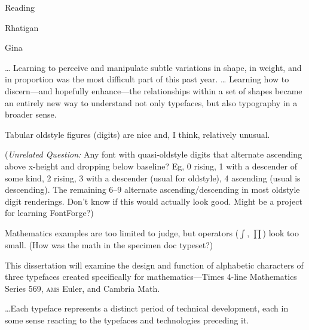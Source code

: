 \documentclass[11pt]{PalisadesLakesBook}
\begin{document}
\begin{plSection}{Reading}
\begin{plSection}{Rhatigan}
\begin{plSection}{Gina}
\begin{plSection}{}
\begin{plQuote}{}{}
{\ldots}
Learning to perceive and manipulate subtle variations in shape,
in weight, and in proportion was the most difficult part 
of this past year.
{\ldots} Learning how to discern---and hopefully enhance---the
relationships within a set of shapes became
an entirely new way to understand not only typefaces,
but also typography in a broader sense.
\end{plQuote}

\end{plSection}%
\begin{plSection}{}

Tabular oldstyle figures (digits) are nice and, I think,
relatively unusual.

(\emph{Unrelated Question:} 
Any font with quasi-oldstyle digits that alternate 
ascending above x-height and dropping below baseline?
Eg, 0 rising, 1 with a descender of some kind, 2 rising, 3 with
a descender (usual for oldstyle), 4 ascending (usual is descending).
The remaining 6--9 alternate ascending/descending in most
oldstyle digit renderings.
Don't know if this would actually look good.
Might be a project for learning FontForge?)

Mathematics examples are too limited to judge, 
but operators ($\int$, $\prod$) look too small. 
(How was the math in the specimen doc typeset?)

\end{plSection}%
\end{plSection}%
\begin{plSection}{}


\begin{plQuote}{}{}
This dissertation will examine the design and function of
alphabetic characters of three typefaces created specifically for
mathematics---Times 4-line Mathematics Series 569,
\textsc{ams} Euler, and Cambria Math.

{\ldots}Each typeface represents a distinct period of technical
development, each in some sense reacting to the typefaces 
and technologies preceding it.


\end{plQuote}
\end{plSection}
\end{plSection}
\end{plSection}
\end{document}
